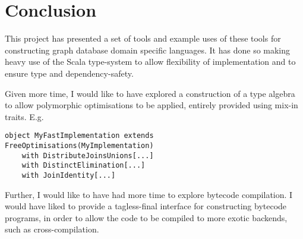 \documentclass{report}
\newcommand \2[0]{\textbf{2}}
\newcommand \3[0]{\textbf{3}}
\begin{document}
\chapter{Conclusion}
This project has presented a set of tools and example uses of these tools for constructing graph database domain specific languages. It has done so making heavy use of the Scala type-system to allow flexibility of implementation and to ensure type and dependency-safety.

Given more time, I would like to have explored a construction of a type algebra to allow polymorphic optimisations to be applied, entirely provided using mix-in traits. E.g.

\begin{verbatim}
object MyFastImplementation extends FreeOptimisations(MyImplementation) 
    with DistributeJoinsUnions[...]
    with DistinctElimination[...]
    with JoinIdentity[...]
\end{verbatim}

Further, I would like to have had more time to explore bytecode compilation. I would have liked to provide a tagless-final interface for constructing bytecode programs, in order to allow the code to be compiled to more exotic backends, such as cross-compilation.
    
\end{document}

